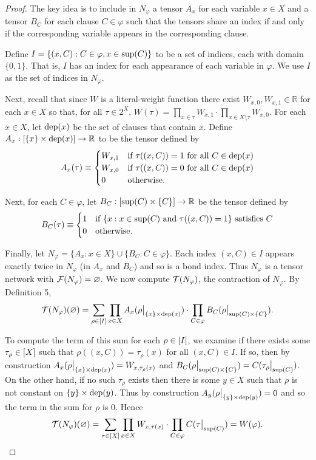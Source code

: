 \begin{proof}
The key idea is to include in $N_\varphi$ a tensor $A_x$ for each variable $x \in X$ and a tensor $B_C$ for each clause $C \in \varphi$ such that the tensors share an index if and only if the corresponding variable appears in the corresponding clause.

Define $I = \{(x, C) : C \in \varphi, x \in \text{sup}(C)\}$ to be a set of indices, each with domain $\{0, 1\}$. That is, $I$ has an index for each appearance of each variable in $\varphi$. We use $I$ as the set of indices in $N_\varphi$.

Next, recall that since $W$ is a literal-weight function there exist $W_{x,0}, W_{x,1} \in \mathbb{R}$ for each $x \in X$ so that, for all $\tau \in 2^X$, $W(\tau) = \prod_{x \in \tau} W_{x,1} \cdot \prod_{x \in X \setminus \tau} W_{x,0}$. For each $x \in X$, let $\text{dep}(x)$ be the set of clauses that contain $x$. Define $A_x: [\{x\} \times \text{dep}(x)] \rightarrow \mathbb{R}$ to be the tensor defined by $$A_x(\tau) \equiv \begin{cases}W_{x,1}&\text{if}~\tau((x,C)) = 1~\text{for all}~C \in \text{dep}(x)\\W_{x,0}&\text{if}~\tau((x,C)) = 0~\text{for all}~C \in \text{dep}(x)\\0&\text{otherwise.}\end{cases}$$

Next, for each $C \in \varphi$, let $B_C: [\text{sup}(C) \times \{C\}] \rightarrow \mathbb{R}$ be the tensor defined by
$$B_C(\tau) \equiv \begin{cases}1& \text{if}~\{x: x \in \text{sup}(C)~\text{and}~\tau((x, C)) = 1\}~\text{satisfies}~C\\0&\text{otherwise.}\end{cases}$$

Finally, let $N_\varphi = \{ A_x : x \in X\} \cup \{B_C : C \in \varphi\}$. Each index $(x, C) \in I$ appears exactly twice in $N_\varphi$ (in $A_x$ and $B_C$) and so is a bond index. Thus $N_\varphi$ is a tensor network with $\mathcal{F}(N_\varphi) = \varnothing$. We now compute $\mathcal{T}(N_\varphi)$, the contraction of $N_\varphi$. By Definition 5,
$$\mathcal{T}(N_\varphi)(\varnothing) = \sum_{\rho \in [I]} \prod_{x \in X} A_x(\rho\big|_{\{x\} \times \text{dep}(x)}) \cdot \prod_{C \in \varphi} B_C(\rho\big|_{\text{sup}(C) \times \{C\}}).$$

To compute the term of this sum for each $\rho \in [I]$, we examine if there exists some $\tau_\rho \in [X]$ such that $\rho((x, C)) = \tau_\rho(x)$ for all $(x, C) \in I$. If so, then by construction $A_x(\rho\big|_{\{x\} \times \text{dep}(x)}) = W_{x, \tau_\rho(x)}$ and $B_C(\rho\big|_{\text{sup}(C) \times \{C\}}) = C(\tau_\rho\big|_{\text{sup}(C)})$. On the other hand, if no such $\tau_\rho$ exists then there is some $y \in X$ such that $\rho$ is not constant on $\{y\} \times \text{dep}(y)$. Thus by construction $A_y(\rho\big|_{\{y\} \times \text{dep}(y)}) = 0$ and so the term in the sum for $\rho$ is 0. Hence
$$\mathcal{T}(N_\varphi)(\varnothing) = \sum_{\tau \in [X]} \prod_{x \in X} W_{x, \tau(x)} \cdot \prod_{C \in \varphi} C(\tau\big|_{\text{sup}(C)}) = W(\varphi).$$
\end{proof}

